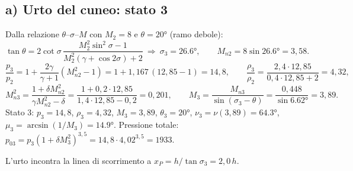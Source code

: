 \documentclass[11pt,a4paper]{article}
\begin{document}
\subsection*{a) Urto del cuneo: stato 3}
Dalla relazione $\theta$--$\sigma$--$M$ con $M_2=8$ e $\theta=\ang{20}$ (ramo debole):
\[
\tan\theta=2\cot\sigma\,\frac{M_2^2\sin^2\sigma-1}{M_2^2(\gamma+\cos2\sigma)+2}
\ \Rightarrow\ \sigma_3=\ang{26.6},\qquad M_{n2}=8\sin\ang{26.6}=3{,}58 .
\]
\[
\frac{p_3}{p_2}=1+\frac{2\gamma}{\gamma+1}(M_{n2}^2-1)=1+1{,}167\,(12{,}85-1)=14{,}8,\qquad
\frac{\rho_3}{\rho_2}=\frac{2{,}4\cdot12{,}85}{0{,}4\cdot12{,}85+2}=4{,}32,
\]
\[
M_{n3}^2=\frac{1+\delta M_{n2}^2}{\gamma M_{n2}^2-\delta}=\frac{1+0{,}2\cdot12{,}85}{1{,}4\cdot12{,}85-0{,}2}=0{,}201,
\qquad M_3=\frac{M_{n3}}{\sin(\sigma_3-\theta)}=\frac{0{,}448}{\sin\ang{6.62}}=3{,}89 .
\]
Stato 3: $p_3=14{,}8$, $\rho_3=4{,}32$, $M_3=3{,}89$, $\theta_3=\ang{20}$, $\nu_3=\nu(3{,}89)=\ang{64.3}$,
$\mu_3=\arcsin(1/M_3)=\ang{14.9}$. Pressione totale:
$p_{03}=p_3(1+\delta M_3^2)^{3{,}5}=14{,}8\cdot4{,}02^{3{,}5}=1933$.

L'urto incontra la linea di scorrimento a $x_P=h/\tan\sigma_3=2{,}0\,h$.
\end{document}
